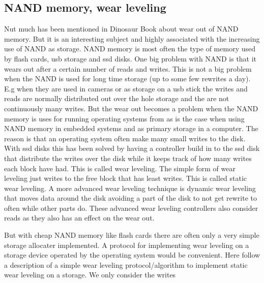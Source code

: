 \documentclass[a4paper,12pt,danish]{report}
\begin{document}
\subsection{NAND memory, wear leveling}Nut much has been mentioned in Dinosaur Book about wear out of NAND memory. But it is an interesting subject and highly associated with the increasing use of NAND as storage.
NAND memory is most often the type of memory used by flash cards, usb storage and ssd disks.
One big problem with NAND is that it wears out after a certain number of reads and writes. This is not a big problem when the NAND is used for long time storage (up to some few rewrites a day). E.g when they are used in cameras or as storage on a usb stick the writes and reads are normally distributed out over the hole storage and the are not continuously many writes. But the wear out becomes a problem when the NAND memory is uses for running operating systems from as is the case when using NAND memory in embedded systems and as primary storage in a computer. The reason is that an operating system often make many small writes to the disk. With ssd disks this has been solved by having a controller build in to the ssd disk that distribute the writes over the disk while it keeps track of how many writes each block have had. This is called wear leveling. The simple form of wear leveling just writes to the free block that has least writes. This is called static wear leveling. A more advanced wear leveling technique is dynamic wear leveling that moves data around the disk avoiding a part of the disk to not get rewrite to often while other parts do. These advanced wear leveling controllers also consider reads as they also has an effect on the wear out.

But with cheap NAND memory like flash cards there are often only a very simple
storage allocater implemented. A protocol for implementing wear leveling on a storage device operated by the operating system would be convenient. Here follow a description of a simple wear leveling protocol/algorithm to implement static wear leveling on a storage. We only consider the writes
\end{document}
